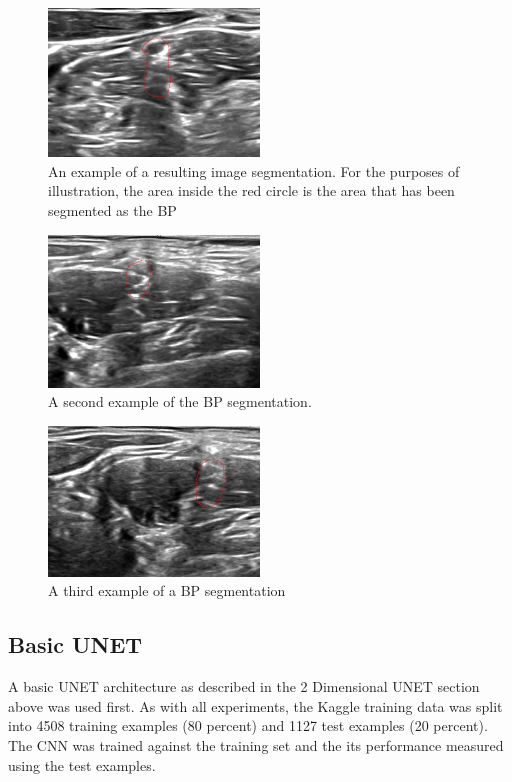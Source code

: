 \documentclass[letterpaper]{article}
\begin{document}
 \begin{figure}[H]
  \centerline{\includegraphics[width=0.5\textwidth]{Images/SegmentExample1.png}}
  \caption{An example of a resulting image segmentation. For the purposes of illustration, the area inside the red circle is the area that has been segmented as the BP}
  \label{fig:BPSegmentation1}
\end{figure}

 \begin{figure}[H]
  \centerline{\includegraphics[width=0.5\textwidth]{Images/SegmentExample2.png}}
  \caption{A second example of the BP segmentation.}
  \label{fig:BPSegmentation2}
\end{figure}

 \begin{figure}[H]
  \centerline{\includegraphics[width=0.5\textwidth]{Images/SegmentExample3.png}}
  \caption{A third example of a BP segmentation}
  \label{fig:BPSegmentation3}
\end{figure}

\subsection{Basic UNET}
A basic UNET architecture as described in the 2 Dimensional UNET section above was used first. As with all experiments, the Kaggle training data was split into 4508 training examples (80 percent) and 1127 test examples (20 percent).  The CNN was trained against the training set and the its performance measured using the test examples. 
\end{document}
